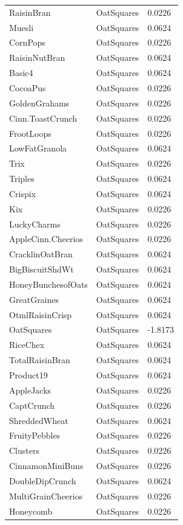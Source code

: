 \begin{table}[!htbp]
\begin{tabular}{lll}
\\
RaisinBran & OatSquares & 0.0226
\\
Muesli & OatSquares & 0.0624
\\
CornPops & OatSquares & 0.0226
\\
RaisinNutBran & OatSquares & 0.0624
\\
Basic4 & OatSquares & 0.0624
\\
CocoaPus & OatSquares & 0.0226
\\
GoldenGrahams & OatSquares & 0.0226
\\
Cinn.ToastCrunch & OatSquares & 0.0226
\\
FrootLoops & OatSquares & 0.0226
\\
LowFatGranola & OatSquares & 0.0624
\\
Trix & OatSquares & 0.0226
\\
Triples & OatSquares & 0.0624
\\
Crispix & OatSquares & 0.0624
\\
Kix & OatSquares & 0.0226
\\
LuckyCharms & OatSquares & 0.0226
\\
AppleCinn.Cheerios & OatSquares & 0.0226
\\
CracklinOatBran & OatSquares & 0.0624
\\
BigBiscuitShdWt & OatSquares & 0.0624
\\
HoneyBunchesofOats & OatSquares & 0.0624
\\
GreatGraines & OatSquares & 0.0624
\\
OtmlRaisinCrisp & OatSquares & 0.0624
\\
OatSquares & OatSquares & -1.8173
\\
RiceChex & OatSquares & 0.0624
\\
TotalRaisinBran & OatSquares & 0.0624
\\
Product19 & OatSquares & 0.0624
\\
AppleJacks & OatSquares & 0.0226
\\
CaptCrunch & OatSquares & 0.0226
\\
ShreddedWheat & OatSquares & 0.0624
\\
FruityPebbles & OatSquares & 0.0226
\\
Clusters & OatSquares & 0.0226
\\
CinnamonMiniBuns & OatSquares & 0.0226
\\
DoubleDipCrunch & OatSquares & 0.0624
\\
MultiGrainCheerios & OatSquares & 0.0226
\\
Honeycomb & OatSquares & 0.0226

\end{tabular}
\end{table}
